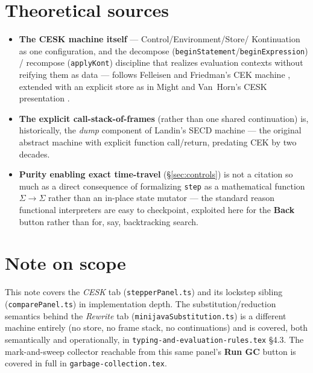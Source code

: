 \documentclass[11pt]{article}
\begin{document}
\section{Theoretical sources}

\begin{itemize}
  \item \textbf{The CESK machine itself} --- Control/Environment/Store/
        Kontinuation as one configuration, and the decompose
        (\texttt{beginStatement}/\texttt{beginExpression}) /
        recompose (\texttt{applyKont}) discipline that realizes evaluation
        contexts without reifying them as data --- follows Felleisen and
        Friedman's CEK machine \cite{felleisen1986control}, extended with
        an explicit store as in Might and Van~Horn's CESK presentation
        \cite{mightvanhorn2010aam}.
  \item \textbf{The explicit call-stack-of-frames} (rather than one shared
        continuation) is, historically, the \emph{dump} component of
        Landin's SECD machine \cite{landin1964scpp} --- the original
        abstract machine with explicit function call/return, predating CEK
        by two decades.
  \item \textbf{Purity enabling exact time-travel} (\S\ref{sec:controls})
        is not a citation so much as a direct consequence of formalizing
        \texttt{step} as a mathematical function $\Sigma \to \Sigma$ rather
        than an in-place state mutator --- the standard reason functional
        interpreters are easy to checkpoint, exploited here for the
        \textbf{Back} button rather than for, say, backtracking search.
\end{itemize}

\section*{Note on scope}
This note covers the \emph{CESK} tab (\texttt{stepperPanel.ts}) and its
lockstep sibling (\texttt{comparePanel.ts}) in implementation depth. The
substitution/reduction semantics behind the \emph{Rewrite} tab
(\texttt{minijavaSubstitution.ts}) is a different machine entirely (no
store, no frame stack, no continuations) and is covered, both semantically
and operationally, in \texttt{typing-and-evaluation-rules.tex} \S4.3. The
mark-and-sweep collector reachable from this same panel's \textbf{Run GC}
button is covered in full in \texttt{garbage-collection.tex}.
\end{document}
